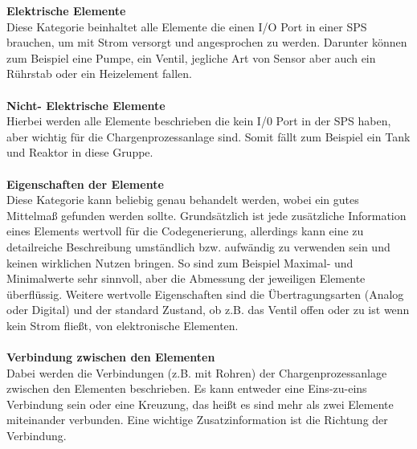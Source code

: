 \textbf{Elektrische Elemente}\\
Diese Kategorie beinhaltet alle Elemente die einen I/O Port in einer SPS brauchen, um mit Strom versorgt und angesprochen zu werden. Darunter können zum Beispiel eine Pumpe, ein Ventil, jegliche Art von Sensor aber auch ein Rührstab oder ein Heizelement fallen. \\\\
\textbf{Nicht- Elektrische Elemente}\\
Hierbei werden alle Elemente beschrieben die kein I/0 Port in der SPS haben, aber wichtig für die Chargenprozessanlage sind. Somit fällt zum Beispiel ein Tank und Reaktor in diese Gruppe.\\\\
\textbf{Eigenschaften der Elemente}  \\
Diese Kategorie kann beliebig genau behandelt werden, wobei ein gutes Mittelmaß gefunden werden sollte. Grundsätzlich ist jede zusätzliche Information eines Elements wertvoll für die Codegenerierung, allerdings kann eine zu detailreiche Beschreibung umständlich bzw. aufwändig zu verwenden sein und keinen wirklichen Nutzen bringen.
So sind zum Beispiel Maximal- und Minimalwerte sehr sinnvoll, aber die Abmessung der jeweiligen Elemente überflüssig. Weitere wertvolle Eigenschaften sind die Übertragungsarten (Analog oder Digital) und der standard Zustand, ob z.B. das Ventil offen oder zu ist wenn kein Strom fließt, von elektronische Elementen.   \\\\
\textbf{Verbindung zwischen den Elementen}  \\
Dabei werden die Verbindungen (z.B. mit Rohren) der Chargenprozessanlage zwischen den Elementen beschrieben. 
Es kann entweder eine Eins-zu-eins Verbindung sein oder eine Kreuzung, das heißt es sind mehr als zwei Elemente miteinander verbunden. Eine wichtige Zusatzinformation ist die Richtung der Verbindung.



